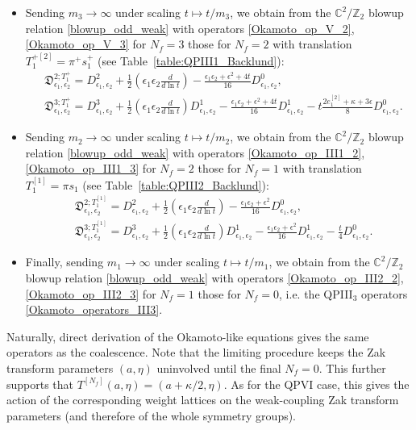 \documentclass[12pt,a4paper]{article}
\numberwithin{equation}{section}
\begin{document}
\begin{itemize}
\item Sending $m_3\rightarrow\infty$ under scaling $t\mapsto t/m_3$, we obtain from the $\mathbb{C}^2/\mathbb{Z}_2$ blowup relation \eqref{blowup_odd_weak} with operators \eqref{Okamoto_op_V_2}, \eqref{Okamoto_op_V_3} for $N_f=3$ those for $N_f=2$ with translation $T_1^{+[2]}=\pi^+s_1^+$ (see Table~\ref{table:QPIII1_Backlund}): 
\begin{align}\label{Okamoto_op_III1_2}
&\mathfrak{D}^{2;T_1^+}_{\epsilon_1,\epsilon_2}=D^2_{\epsilon_1,\epsilon_2}+\frac12\left(\epsilon_1\epsilon_2\frac{d}{d\ln t}\right)-\frac{\epsilon_1\epsilon_2{+}\epsilon^2+4t}{16}D^0_{\epsilon_1,\epsilon_2},\\ \label{Okamoto_op_III1_3}
&\mathfrak{D}^{3;T_1^+}_{\epsilon_1,\epsilon_2}=D^3_{\epsilon_1,\epsilon_2}+\frac12\left(\epsilon_1\epsilon_2\frac{d}{d\ln t}\right)D^1_{\epsilon_1,\epsilon_2}
-\frac{\epsilon_1\epsilon_2{+}\epsilon^2+4t}{16}D^1_{\epsilon_1,\epsilon_2}
-t\frac{2e_1^{[2]}{+}\kappa{+}3\epsilon}8 D^0_{\epsilon_1,\epsilon_2}.
\end{align}

\item
Sending $m_2\rightarrow\infty$ under scaling $t\mapsto t/m_2$, we obtain from the $\mathbb{C}^2/\mathbb{Z}_2$ blowup relation \eqref{blowup_odd_weak} with operators \eqref{Okamoto_op_III1_2}, \eqref{Okamoto_op_III1_3} for $N_f=2$ those for $N_f=1$ with translation $T_1^{[1]}=\pi s_1$ (see Table~\ref{table:QPIII2_Backlund}): 
\begin{align}\label{Okamoto_op_III2_2}
&\mathfrak{D}^{2;T_1^{[1]}}_{\epsilon_1,\epsilon_2}=D^2_{\epsilon_1,\epsilon_2}+\frac12\left(\epsilon_1\epsilon_2\frac{d}{d\ln t}\right)-\frac{\epsilon_1\epsilon_2{+}\epsilon^2}{16}D^0_{\epsilon_1,\epsilon_2},\\ \label{Okamoto_op_III2_3}
&\mathfrak{D}^{3;T_1^{[1]}}_{\epsilon_1,\epsilon_2}=D^3_{\epsilon_1,\epsilon_2}+\frac12\left(\epsilon_1\epsilon_2\frac{d}{d\ln t}\right)D^1_{\epsilon_1,\epsilon_2}
-\frac{\epsilon_1\epsilon_2{+}\epsilon^2}{16}D^1_{\epsilon_1,\epsilon_2}
-\frac{t}4D^0_{\epsilon_1,\epsilon_2}.
\end{align}

\item Finally, sending $m_1\rightarrow\infty$ under scaling $t\mapsto t/m_1$, we obtain from the $\mathbb{C}^2/\mathbb{Z}_2$ blowup relation \eqref{blowup_odd_weak} with operators \eqref{Okamoto_op_III2_2}, \eqref{Okamoto_op_III2_3} for $N_f=1$ those for $N_f=0$, i.e. the QPIII$_3$ operators \eqref{Okamoto_operators_III3}.
\end{itemize}
Naturally, direct derivation of the Okamoto-like equations gives the same operators as the coalescence. Note that the limiting procedure keeps the Zak transform parameters $(a,\eta)$ uninvolved until the final $N_f=0$. This further supports that  $T^{[N_f]}(a,\eta)=(a+\kappa/2,\eta)$. As for the QPVI case, this gives the action of the corresponding weight lattices on the weak-coupling Zak transform parameters (and therefore of the whole symmetry groups).
\end{document}
